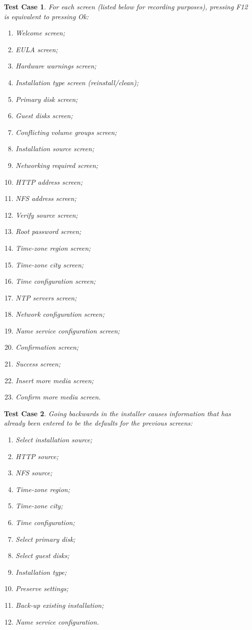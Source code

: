 \documentclass[a4paper]{article}
\newtheorem{testcase}{Test Case}
\begin{document}
\begin{testcase}
For each screen (listed below for recording purposes), pressing F12
is equivalent to pressing Ok:
\begin{enumerate}
\item Welcome screen;
\item EULA screen;
\item Hardware warnings screen;
\item Installation type screen (reinstall/clean);
\item Primary disk screen;
\item Guest disks screen;
\item Conflicting volume groups screen;
\item Installation source screen;
\item Networking required screen;
\item HTTP address screen;
\item NFS address screen;
\item Verify source screen;
\item Root password screen;
\item Time-zone region screen;
\item Time-zone city screen;
\item Time configuration screen;
\item NTP servers screen;
\item Network configuration screen;
\item Name service configuration screen;
\item Confirmation screen;
\item Success screen;
\item Insert more media screen;
\item Confirm more media screen.
\end{enumerate}
\end{testcase}

\begin{testcase}
Going backwards in the installer causes information that has already
been entered to be the defaults for the previous screens:
\begin{enumerate}
\item Select installation source;
\item HTTP source;
\item NFS source;
\item Time-zone region;
\item Time-zone city;
\item Time configuration;
\item Select primary disk;
\item Select guest disks;
\item Installation type;
\item Preserve settings;
\item Back-up existing installation;
\item Name service configuration.
\end{enumerate}
\end{testcase}
\end{document}

